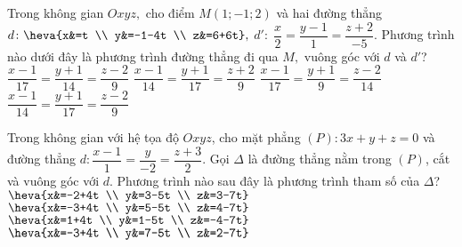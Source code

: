 \begin{ex}%
	Trong không gian $Oxyz,$ cho điểm $M\left(1;-1;2\right)$ và hai đường thẳng $d \colon \heva{x&=t \\ y&=-1-4t \\ z&=6+6t} ,$ $d' \colon \; \dfrac{x}{2} =\dfrac{y-1}{1} =\dfrac{z+2}{-5}$. Phương trình nào dưới đây là phương trình đường thẳng đi qua $M,$ vuông góc với $d$ và $d'$? 
	\choice 
	{$\dfrac{x-1}{17} =\dfrac{y+1}{14} =\dfrac{z-2}{9} $}
	{$\dfrac{x-1}{14} =\dfrac{y+1}{17} =\dfrac{z+2}{9} $}
	{$\dfrac{x-1}{17} =\dfrac{y+1}{9} =\dfrac{z-2}{14} $}
	{\True $\dfrac{x-1}{14} =\dfrac{y+1}{17} =\dfrac{z-2}{9} $} 
\end{ex} 
\begin{ex}%
	Trong không gian với hệ tọa độ $Oxyz$, cho mặt phẳng $\left(P\right) \colon 3x+y+z=0$ và đường thẳng $d \colon \dfrac{x-1}{1} =\dfrac{y}{-2} =\dfrac{z+3}{2} $. Gọi $\Delta $ là đường thẳng nằm trong $\left(P\right)$, cắt và vuông góc với $d$. Phương trình nào sau đây là phương trình tham số của $\Delta $? 
	\choice 
	{$\heva{x&=-2+4t \\ y&=3-5t \\ z&=3-7t} $}
	{\True $\heva{x&=-3+4t \\ y&=5-5t \\ z&=4-7t} $}
	{$\heva{x&=1+4t \\ y&=1-5t \\ z&=-4-7t} $}
	{$\heva{x&=-3+4t \\ y&=7-5t \\ z&=2-7t} $}
\end{ex} 
